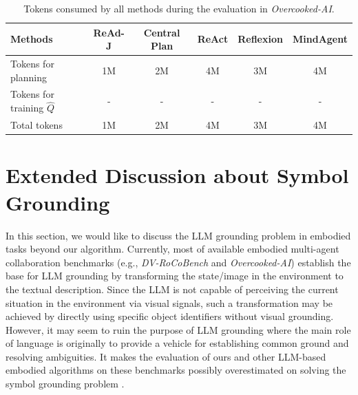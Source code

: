 \documentclass[11pt]{article}
\theoremstyle{plain}
\theoremstyle{remark}
\begin{document}
\begin{table}[ht]
\caption{Tokens consumed by all methods during the evaluation in \emph{Overcooked-AI}.}
\vspace{-1em}
\begin{center}
\begin{small}
\begin{tabular}{lccccc}
\toprule
Methods                        & ReAd-J  & Central Plan & ReAct & Reflexion & MindAgent \\ \midrule
Tokens for planning            & 1M      & 2M           & 4M    & 3M        & 4M        \\ 
Tokens for training $\hat{Q}$  & -       & -            & -     & -         & -         \\ 
Total tokens                   & 1M      & 2M           & 4M    & 3M        & 4M        \\ \bottomrule
\end{tabular}
\end{small}
\end{center}
\label{table:overcooked_consuming}
\vspace{-1em}
\end{table}

\newpage
\section{Extended Discussion about Symbol Grounding}\label{appendix:symbol_grounding}
In this section, we would like to discuss the LLM grounding problem in embodied tasks beyond our algorithm. Currently, most of available embodied multi-agent collaboration benchmarks (e.g., \emph{DV-RoCoBench} and \emph{Overcooked-AI}) establish the base for LLM grounding by transforming the state/image in the environment to the textual description.
Since the LLM is not capable of perceiving the current situation in the environment via visual signals, such a transformation may be achieved by directly using specific object identifiers without visual grounding. However, it may seem to ruin the purpose of LLM grounding where the main role of language is originally to provide a vehicle for establishing common ground and resolving ambiguities. It makes the evaluation of ours and other LLM-based embodied algorithms \citep{ahn2022i, yao2023react, shinn2023reflexion, gong2023mindagent} on these benchmarks possibly overestimated on solving the symbol grounding problem \citep{harnad1990symbol}.
\end{document}
